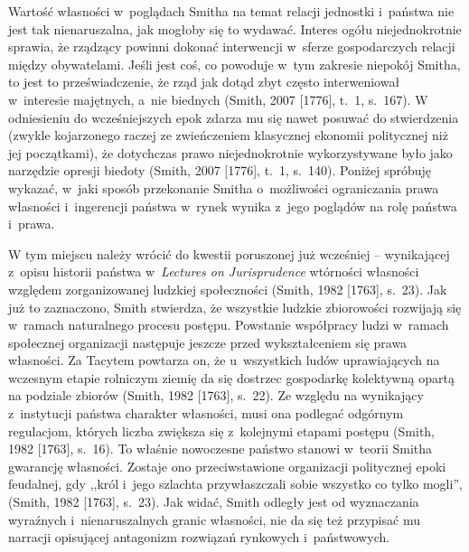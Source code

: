 Wartość własności w~poglądach Smitha na temat relacji jednostki i~państwa nie jest tak nienaruszalna, jak mogłoby się to wydawać. Interes ogółu niejednokrotnie sprawia, że rządzący powinni dokonać interwencji w~sferze gospodarczych relacji między obywatelami. Jeśli jest coś, co powoduje w~tym zakresie niepokój Smitha, to jest to przeświadczenie, że rząd jak dotąd zbyt często interweniował w~interesie majętnych, a~nie biednych \label{ref:RNDKTNonQx9Ln}(Smith, 2007 [1776], t.~1, s.~167). W odniesieniu do wcześniejszych epok zdarza mu się nawet posuwać do stwierdzenia (zwykle kojarzonego raczej ze zwieńczeniem klasycznej ekonomii politycznej niż jej początkami), że dotychczas prawo niejednokrotnie wykorzystywane było jako narzędzie opresji biedoty \label{ref:RNDK2BdJNopfX}(Smith, 2007 [1776], t.~1, s.~140). Poniżej spróbuję wykazać, w~jaki sposób przekonanie Smitha o~możliwości ograniczania prawa własności i~ingerencji państwa w~rynek wynika z~jego poglądów na rolę państwa i~prawa.

W tym miejscu należy wrócić do kwestii poruszonej już wcześniej -- wynikającej z~opisu historii państwa w~\textit{Lectures on Jurisprudence} wtórności własności względem zorganizowanej ludzkiej społeczności \label{ref:RNDH9LUKQOk30}(Smith, 1982 [1763], s.~23). Jak już to zaznaczono, Smith stwierdza, że wszystkie ludzkie zbiorowości rozwijają się w~ramach naturalnego procesu postępu. Powstanie współpracy ludzi w~ramach społecznej organizacji następuje jeszcze przed wykształceniem się prawa własności. Za Tacytem powtarza on, że u~wszystkich ludów uprawiających na wczesnym etapie rolniczym ziemię da się dostrzec gospodarkę kolektywną opartą na podziale zbiorów \label{ref:RNDYghmRxhXTi}(Smith, 1982 [1763], s.~22). Ze względu na wynikający z~instytucji państwa charakter własności, musi ona podlegać odgórnym regulacjom, których liczba zwiększa się z~kolejnymi etapami postępu \label{ref:RND1yCVEykFX7}(Smith, 1982 [1763], s.~16). To właśnie nowoczesne państwo stanowi w~teorii Smitha gwarancję własności. Zostaje ono przeciwstawione organizacji politycznej epoki feudalnej, gdy ,,król i~jego szlachta przywłaszczali sobie wszystko co tylko mogli'', \label{ref:RNDcpxaJZ2IE6}(Smith, 1982 [1763], s.~23). Jak widać, Smith odległy jest od wyznaczania wyraźnych i~nienaruszalnych granic własności, nie da się też przypisać mu narracji opisującej antagonizm rozwiązań rynkowych i~państwowych.

